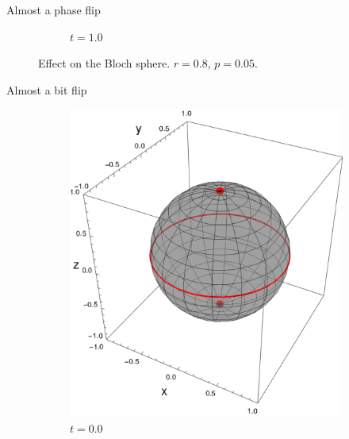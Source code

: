 \begin{frame}{Almost a phase flip}
\begin{figure}[h!]
\begin{subfigure}{0.32\textwidth}
            \caption{$t=1.0$}
        \end{subfigure}
        \caption{Effect on the Bloch sphere. $r=0.8$, $p=0.05$.}
    \end{figure}
\end{frame}

\begin{frame}{Almost a bit flip}
    \begin{figure}[h!]
        \centering
        \begin{subfigure}{0.32\textwidth}
            \centering
            \includegraphics[width=0.9\linewidth]{figures/sphere_CNOT_t=0.0_z=0.8_p=0.05.png}
            \caption{$t=0.0$}
        \end{subfigure}%
        \begin{subfigure}{0.32\textwidth}
            \centering

\end{subfigure}
\end{figure}
\end{frame}
